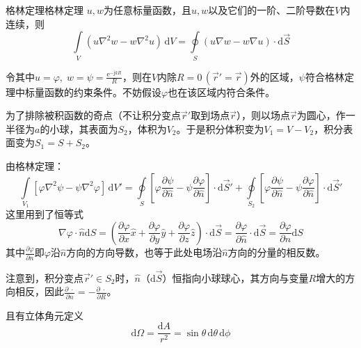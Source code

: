         \begin{lemma}{格林定理}{格林定理}
            $u,w$为任意标量函数，且$u,w$以及它们的一阶、二阶导数在$V$内连续，则
            \begin{equation}
                \int\limits_V (u \nabla^2w-w \nabla^2u)\,\mathrm{d}V=\oint\limits_S (u \nabla w-w \nabla u)\cdot\mathrm{d}\vec{S}
            \end{equation}
        \end{lemma}

        令其中$u=\varphi,\;w=\psi=\frac{\mathrm{e}^{-\mathrm{j}k R}}{R}$，则在$V$内除$R=0\,(\vec{r}'=\vec{r})$外的区域，$\psi$符合格林定理中标量函数的约束条件。不妨假设$\varphi$也在该区域内符合条件。

        为了排除被积函数的奇点（不让积分变点$\vec{ r}'$取到场点$\vec{r}$），则以场点$\vec{r}$为圆心，作一半径为$a$的小球，其表面为$S_2$，体积为$V_2$。于是积分体积变为$V_1=V-V_2$，积分表面变为$S_1=S+S_2$。

        由格林定理：
        \begin{equation}\label{Equ: 方程求解滞后势}
            \int\limits_{V_1}\left[\varphi \nabla^2\psi-\psi \nabla^2 \varphi\right]\,\mathrm{d}V'
            =\oint\limits_{S} \left[\varphi \frac{\partial \psi}{\partial \hat{n}}-\psi \frac{\partial \varphi}{\partial \hat{n}}\right]\cdot\mathrm{d}\vec{S}'
            +\oint\limits_{S_2} \left[\varphi \frac{\partial \psi}{\partial \hat{n}}-\psi \frac{\partial \varphi}{\partial \hat{n}}\right]\cdot\mathrm{d}\vec{S}'
        \end{equation}
        这里用到了恒等式
        \begin{equation*}
            \nabla \varphi \cdot \hat{n}\mathrm{d}S
            =\left(\frac{\partial \varphi}{\partial x}\hat{x}+\frac{\partial \varphi}{\partial y}\hat{y}+\frac{\partial \varphi}{\partial z}\hat{z}\right)\cdot \mathrm{d}\vec{S}
            =\frac{\partial \varphi}{\partial \hat{n}}\cdot \mathrm{d}\vec{S}
            =\frac{\partial \varphi}{\partial n}\mathrm{d}S
        \end{equation*}
        其中$\frac{\partial \varphi}{\partial n}$即$\varphi$沿$\hat{n}$方向的方向导数，也等于此处电场沿$\hat{n}$方向的分量的相反数。

        注意到，积分变点$\vec{r}'\in S_2$时，$\hat{n}$（$\mathrm{d}\vec{S}$）恒指向小球球心，其方向与变量$R$增大的方向相反，因此$\frac{\partial \;\cdot }{\partial n}=-\frac{\partial \;\cdot}{\partial R}$。
        
        且有立体角元定义
        \begin{equation}
            \mathrm{d}\varOmega=\frac{\mathrm{d}A}{r^2}=\sin\theta \,\mathrm{d}\theta \,\mathrm{d}\phi
        \end{equation}
        
